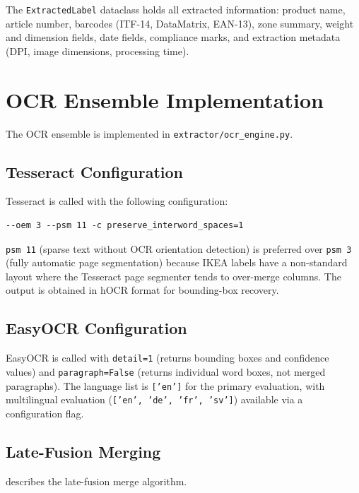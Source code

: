 The \texttt{ExtractedLabel} dataclass holds all extracted information:
product name, article number, barcodes (ITF-14, DataMatrix, EAN-13), zone summary,
weight and dimension fields, date fields, compliance marks, and extraction metadata
(DPI, image dimensions, processing time).

\section{OCR Ensemble Implementation}

The OCR ensemble is implemented in \texttt{extractor/ocr\_engine.py}.

\subsection{Tesseract Configuration}

Tesseract is called with the following configuration:
\begin{verbatim}
--oem 3 --psm 11 -c preserve_interword_spaces=1
\end{verbatim}

\texttt{psm 11} (sparse text without \ac{OCR} orientation detection) is preferred over
\texttt{psm 3} (fully automatic page segmentation) because IKEA labels have a non-standard
layout where the Tesseract page segmenter tends to over-merge columns. The output is
obtained in hOCR format for bounding-box recovery.

\subsection{EasyOCR Configuration}

EasyOCR is called with \texttt{detail=1} (returns bounding boxes and confidence values)
and \texttt{paragraph=False} (returns individual word boxes, not merged paragraphs). The
language list is \texttt{['en']} for the primary evaluation, with multilingual evaluation
(\texttt{['en', 'de', 'fr', 'sv']}) available via a configuration flag.

\subsection{Late-Fusion Merging}

 describes the late-fusion merge algorithm.

